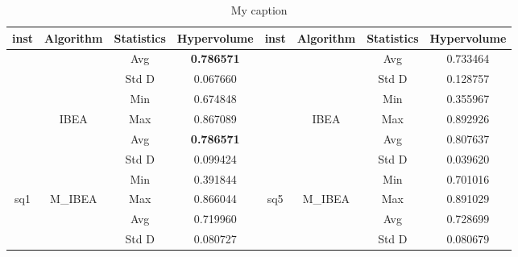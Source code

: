 \begin{table}[]
	\centering
	\caption{My caption}
	\label{my-labe2}
	\begin{tabular}{cccccccc}
		\hline
		inst                  & Algorithm                 & Statistics & Hypervolume       & inst                  & Algorithm                                         & Statistics & Hypervolume       \\ \hline
		&                           & Avg        & \textbf{0.786571} &                       &                                                   & Avg        & 0.733464          \\ \cline{3-4} \cline{7-8} 
		&                           & Std D      & 0.067660          &                       &                                                   & Std D      & 0.128757          \\ \cline{3-4} \cline{7-8} 
		&                           & Min        & 0.674848          &                       &                                                   & Min        & 0.355967          \\ \cline{3-4} \cline{7-8} 
		& \multirow{-4}{*}{IBEA}    & Max        & 0.867089          &                       & \multirow{-4}{*}{IBEA}                            & Max        & 0.892926          \\ \cline{2-4} \cline{6-8} 
		&                           & Avg        & \textbf{0.786571} &                       & \cellcolor[HTML]{C0C0C0}                          & Avg        & 0.807637          \\ \cline{3-4} \cline{7-8} 
		&                           & Std D      & 0.099424          &                       & \cellcolor[HTML]{C0C0C0}                          & Std D      & 0.039620          \\ \cline{3-4} \cline{7-8} 
		&                           & Min        & 0.391844          &                       & \cellcolor[HTML]{C0C0C0}                          & Min        & 0.701016          \\ \cline{3-4} \cline{7-8} 
		\multirow{-8}{*}{sq1} & \multirow{-4}{*}{M\_IBEA} & Max        & 0.866044          & \multirow{-8}{*}{sq5} & \multirow{-4}{*}{\cellcolor[HTML]{C0C0C0}M\_IBEA} & Max        & 0.891029          \\ \hline
		&                           & Avg        & 0.719960          &                       &                                                   & Avg        & 0.728699          \\ \cline{3-4} \cline{7-8} 
		&                           & Std D      & 0.080727          &                       &                                                   & Std D      & 0.080679          \\ \cline{3-4} \cline{7-8} 

\end{tabular}
\end{table}

